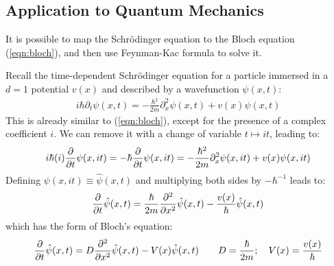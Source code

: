 \documentclass[../template.tex]{subfiles}
\begin{document}
\subsection{Application to Quantum Mechanics}
It is possible to map the Schr\"odinger equation to the Bloch equation (\ref{eqn:bloch}), and then use Feynman-Kac formula to solve it.

Recall the time-dependent Schr\"odinger equation for a particle immersed in a $d=1$ potential $v(x)$ and described by a wavefunction $\psi(x,t)$:
    \begin{align*}
        i\hbar \partial_t \psi(x,t) = -\frac{\hbar^2}{2m} \partial_x^2 \psi(x,t) + v(x) \psi(x,t) 
    \end{align*}
This is already similar to (\ref{eqn:bloch}), except for the presence of a complex coefficient $i$. We can remove it with a change of variable $t \mapsto it$, leading to:
\begin{align*}
    i \hbar (i) \pdv{t} \psi(x,it) = - \hbar \pdv{t} \psi(x,it) = - \frac{\hbar^2}{2m} \partial_x^2 \psi(x,it) + v(x) \psi(x,it) 
\end{align*}
Defining $\psi(x,it) \equiv \hat{\psi}(x,t)$ and multiplying both sides by $-\hbar^{-1}$ leads to:
\begin{align*}
    \pdv{t} \hat{\psi}(x,t) = \frac{\hbar}{2 m} \pdv[2]{x} \hat{\psi}(x,t)  - \frac{v(x)}{\hbar} \hat{\psi}(x,t) 
\end{align*}
which has the form of Bloch's equation:
\begin{align*}
    \pdv{t} \hat{\psi}(x,t) = D \pdv[2]{x} \hat{\psi}(x,t) - V(x) \hat{\psi}(x,t) \qquad D = \frac{\hbar}{2m}; \quad V(x) = \frac{v(x)}{\hbar} 
\end{align*}
\end{document}
